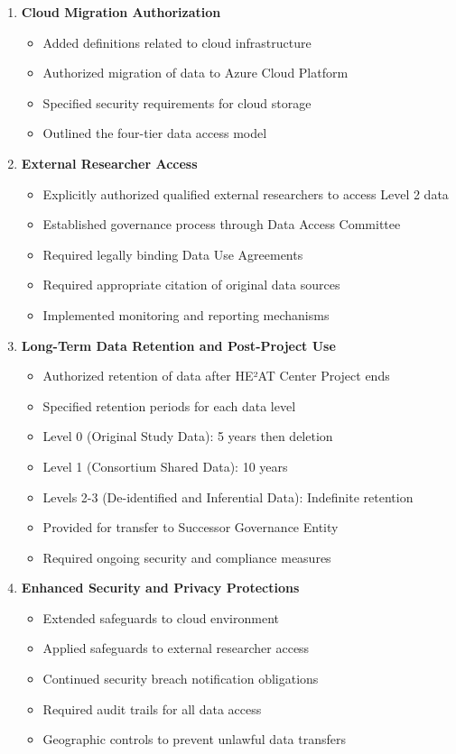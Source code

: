 \begin{enumerate}
\item \textbf{Cloud Migration Authorization}
   \begin{itemize}
   \item Added definitions related to cloud infrastructure
   \item Authorized migration of data to Azure Cloud Platform
   \item Specified security requirements for cloud storage
   \item Outlined the four-tier data access model
   \end{itemize}

\item \textbf{External Researcher Access}
   \begin{itemize}
   \item Explicitly authorized qualified external researchers to access Level 2 data
   \item Established governance process through Data Access Committee
   \item Required legally binding Data Use Agreements
   \item Required appropriate citation of original data sources
   \item Implemented monitoring and reporting mechanisms
   \end{itemize}

\item \textbf{Long-Term Data Retention and Post-Project Use}
   \begin{itemize}
   \item Authorized retention of data after HE²AT Center Project ends
   \item Specified retention periods for each data level
   \item Level 0 (Original Study Data): 5 years then deletion
   \item Level 1 (Consortium Shared Data): 10 years
   \item Levels 2-3 (De-identified and Inferential Data): Indefinite retention
   \item Provided for transfer to Successor Governance Entity
   \item Required ongoing security and compliance measures
   \end{itemize}

\item \textbf{Enhanced Security and Privacy Protections}
   \begin{itemize}
   \item Extended safeguards to cloud environment
   \item Applied safeguards to external researcher access
   \item Continued security breach notification obligations
   \item Required audit trails for all data access
   \item Geographic controls to prevent unlawful data transfers
   \end{itemize}


\end{enumerate}
